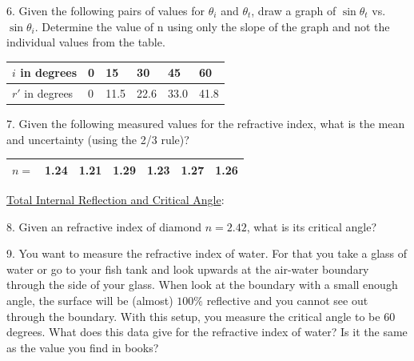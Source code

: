 6. Given the following pairs of values for $\theta_{i}$ and $\theta_{t}$, draw a graph of $\sin \theta_{t}$ vs. $\sin \theta_{i}$. Determine the value of n using only the slope of the graph and not the individual values from the table.
\begin{table}[h]
    \centering
    \begin{tabular}{|l|l|l|l|l|l|}
        \hline
        $i$ in degrees & 0 & 15 & 30 & 45 & 60 \\ \hline
        $r'$ in degrees & 0 & 11.5 & 22.6 & 33.0 & 41.8 \\ \hline
    \end{tabular}
\end{table}

7. Given the following measured values for the refractive index, what is the mean and uncertainty (using the 2/3 rule)?
\begin{table}[h]
    \centering
    \begin{tabular}{|l|l|l|l|l|l|l|}
        \hline
        $n=$ & 1.24 & 1.21 & 1.29 & 1.23 & 1.27 & 1.26 \\ \hline
    \end{tabular}
\end{table}

\noindent \underline{Total Internal Reflection and Critical Angle}: \myskip

8. Given an refractive index of diamond $n = 2.42$, what is its critical angle? \myskip

9. You want to measure the refractive index of water. For that you take a glass of water or go to your fish tank and look upwards at the air-water boundary through the side of your glass. When look at the boundary with a small enough angle, the surface will be (almost) $100\%$ reflective and you cannot see out through the boundary. With this setup, you measure the critical angle to be 60 degrees. What does this data give for the refractive index of water? Is it the same as the value you find in books?
